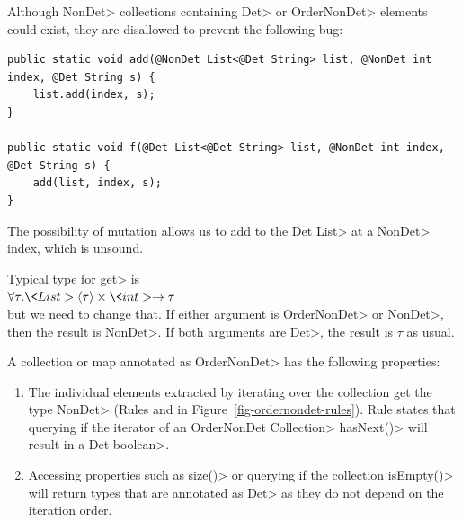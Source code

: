  Although \<NonDet> collections containing \<Det> or \<OrderNonDet> elements could exist, they are
disallowed to prevent the following bug:

\begin{verbatim}
public static void add(@NonDet List<@Det String> list, @NonDet int index, @Det String s) {
    list.add(index, s);
}

public static void f(@Det List<@Det String> list, @NonDet int index, @Det String s) {
    add(list, index, s);
}
\end{verbatim}

The possibility of mutation allows us to add to the \<Det List> at a
\<NonDet> index, which is unsound.

Typical type for \<get> is \\
$\forall \tau . \<List>\angles{\tau} \times \<int> \rightarrow \tau$ \\
but we need to change that.  If either argument is \<OrderNonDet> or \<NonDet>, then the
result is \<NonDet>.
If both arguments are \<Det>, the result is $\tau$ as usual.





A collection or map annotated as \<OrderNonDet> has the following properties:
\begin{enumerate}
    \item The individual elements extracted by iterating over the collection get the type \<NonDet> (Rules  and  in Figure~\ref{fig-ordernondet-rules}). 
    Rule  states that querying if the iterator of an \<OrderNonDet Collection> \<hasNext()> will result in a \<Det boolean>.
    \item Accessing properties such as \<size()> or querying if the collection \<isEmpty()> will return types
    that are annotated as \<Det> as they do not depend on the iteration order. 
\end{enumerate}

